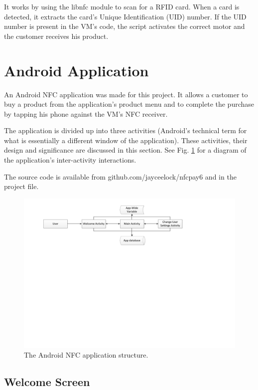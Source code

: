 It works by using the libnfc module to scan for a RFID
card. When a card is detected, it extracts the card's Unique Identification (UID)
number. If the UID number is present in the VM's code, the script activates the
correct motor and the customer receives his product. 

\section{Android Application}
\label{sec:nfc-android-app}

An Android NFC application was made for this project. It allows a customer to buy a
product from the application's product menu and to complete the purchase by tapping
his phone against the VM's NFC receiver.

The application is divided up into three activities (Android's technical term for what
is essentially a different window of the application). These activities, their design and
significance are discussed in this section. See Fig. \ref{fig:nfc_app_structure} for a
diagram of the application's inter-activity interactions.

The source code is available from github.com/jayceelock/nfcpay6 and in the
project file.

\begin{figure}
 \centering 
 \includegraphics[clip = true, trim = 40 410 0 20,
 scale=0.7]{app_structure}
 \caption{The Android NFC application structure.}
 \label{fig:nfc_app_structure}
\end{figure}

\subsection{Welcome Screen}

